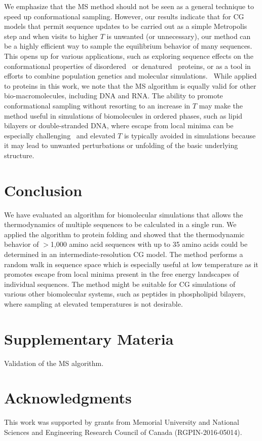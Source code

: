 \documentclass[
aip,
rsi,%
amsmath,amssymb,
reprint,%
]{revtex4-1}
\begin{document}
We emphasize that the MS method should not be seen as a general technique to speed up conformational sampling. However, our results indicate that for CG models that permit sequence updates to be carried out as a simple Metropolis step and when visits to higher $T$ is unwanted (or unnecessary), our method can be a highly efficient way to sample the equilibrium behavior of many sequences. {\color{red} This opens up for various applications, such as exploring sequence effects on the conformational properties of disordered~\cite{Das2013} or denatured~\cite{Meng2013} proteins, or as a tool in efforts to combine population genetics and molecular simulations.~\cite{Serohijos2014} While applied to proteins in this work, we note that the MS algorithm is equally valid for other bio-macromolecules, including DNA and RNA.} The ability to promote conformational sampling without resorting to an increase in $T$ may make the method useful in simulations of biomolecules in ordered phases, such as lipid bilayers or double-stranded DNA, where escape from local minima can be especially challenging~\cite{Bereau2015,Curuksu2009} and elevated $T$ is typically avoided in simulations because it may lead to unwanted perturbations or unfolding of the basic underlying structure.

\section{Conclusion}

We have evaluated an algorithm for biomolecular simulations that allows the thermodynamics of multiple  sequences to be calculated in a single run. We applied the algorithm to protein folding and showed that the thermodynamic behavior of $>$1,000 amino acid sequences with up to 35 amino acids could be determined in an intermediate-resolution CG model. The method performs a random walk in sequence space which is especially useful at low temperature as it promotes escape from local minima present in the free energy landscapes of individual sequences. The method might be suitable for CG simulations of {\color{red} various} other biomolecular systems, such as peptides in phospholipid bilayers, where sampling at elevated temperatures is not desirable. 

\section{Supplementary Materia} 

Validation of the MS algorithm. 

\section{Acknowledgments}

This work was supported by grants from Memorial University and National Sciences and Engineering Research Council of Canada (RGPIN-2016-05014).  


%
\end{document}

